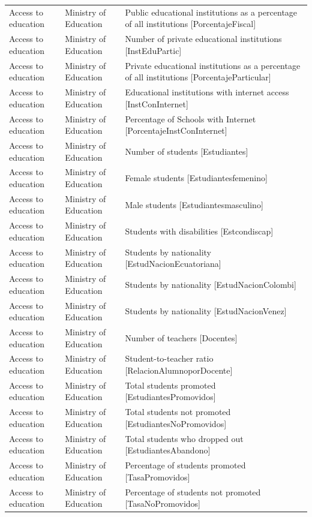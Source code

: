 \begin{landscape}
\begin{longtable}[t]{>{\raggedright\arraybackslash}p{3.4cm}>{\raggedright\arraybackslash}p{5.6cm}>{\raggedright\arraybackslash}p{12.4cm}}
Access to education & Ministry of Education & Public educational institutions as a percentage of all institutions [PorcentajeFiscal]\\
Access to education & Ministry of Education & Number of private educational institutions [InstEduPartic]\\
Access to education & Ministry of Education & Private educational institutions as a percentage of all institutions [PorcentajeParticular]\\
Access to education & Ministry of Education & Educational institutions with internet access [InstConInternet]\\
Access to education & Ministry of Education & Percentage of Schools with Internet [PorcentajeInstConInter\allowbreak{}net]\\
Access to education & Ministry of Education & Number of students [Estudiantes]\\
Access to education & Ministry of Education & Female students [Estudiantesfemenino]\\
Access to education & Ministry of Education & Male students [Estudiantesmasculino]\\
Access to education & Ministry of Education & Students with disabilities [Estcondiscap]\\
Access to education & Ministry of Education & Students by nationality [EstudNacionEcuatoriana]\\
Access to education & Ministry of Education & Students by nationality [EstudNacionColombi]\\
Access to education & Ministry of Education & Students by nationality [EstudNacionVenez]\\
Access to education & Ministry of Education & Number of teachers [Docentes]\\
Access to education & Ministry of Education & Student-to-teacher ratio [RelacionAlumnoporDocen\allowbreak{}te]\\
Access to education & Ministry of Education & Total students promoted [EstudiantesPromovidos]\\
Access to education & Ministry of Education & Total students not promoted [EstudiantesNoPromovido\allowbreak{}s]\\
Access to education & Ministry of Education & Total students who dropped out [EstudiantesAbandono]\\
Access to education & Ministry of Education & Percentage of students promoted [TasaPromovidos]\\
Access to education & Ministry of Education & Percentage of students not promoted [TasaNoPromovidos]\\

\end{longtable}
\end{landscape}
